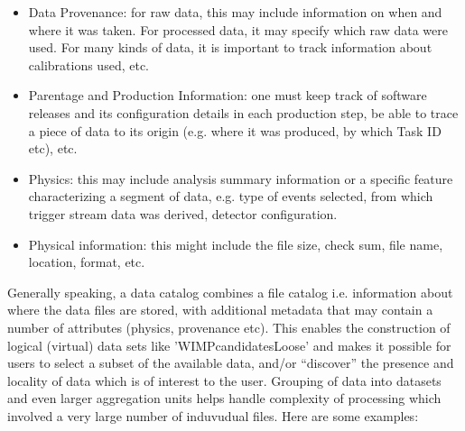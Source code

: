 \begin{itemize}
\item Data Provenance: for raw data, this may include information on when and where it was taken. For processed data,
it may specify which raw data were used. For many kinds of data, it is important to track information about calibrations used, etc.


\item Parentage and Production Information: one must keep track of software releases and its configuration details in each production step,
be able to trace a piece of data to its origin (e.g. where it was produced, by which Task ID etc), etc.


\item Physics: this may include analysis summary information or a specific feature characterizing a segment of data, e.g. type of events selected, from which trigger stream data was derived, detector configuration.
\item Physical information: this might include the file size, check sum, file name, location, format, etc.
\end{itemize}
Generally speaking, a data catalog combines a file catalog i.e. information about where the data files are stored,
with additional metadata that may contain a number of attributes (physics, provenance etc). This enables the construction of logical (virtual)
data sets like 'WIMPcandidatesLoose' and makes it possible for users to select a subset of the available data, and/or ``discover'' the presence and locality of data which
is of interest to the user.
Grouping of data into datasets and even larger aggregation units helps handle complexity of processing which involved a very large number of induvudual files.
Here are some examples:

